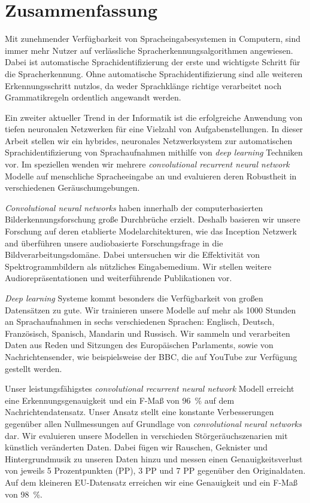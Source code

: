 \section*{\LARGE Zusammenfassung}
Mit zunehmender Verf\"ugbarkeit von Spracheingabesystemen in Computern, sind immer mehr Nutzer auf verl\"assliche Spracherkennungsalgorithmen angewiesen. Dabei ist automatische Sprachidentifizierung der erste und wichtigste Schritt f\"ur die Spracherkennung. Ohne automatische Sprachidentifizierung sind alle weiteren Erkennungsschritt nutzlos, da weder Sprachkl\"ange richtige verarbeitet noch Grammatikregeln ordentlich angewandt werden.

Ein zweiter aktueller Trend in der Informatik ist die erfolgreiche Anwendung von tiefen neuronalen Netzwerken f\"ur eine Vielzahl von Aufgabenstellungen. In dieser Arbeit stellen wir ein hybrides, neuronales Netzwerksystem zur automatischen Sprachidentifizierung von Sprachaufnahmen mithilfe von \emph{deep learning} Techniken vor. Im speziellen wenden wir mehrere \emph{convolutional recurrent neural network} Modelle auf menschliche Spracheeingabe an und evaluieren deren Robustheit in verschiedenen Ger\"auschumgebungen.

\emph{Convolutional neural networks} haben innerhalb der computerbasierten Bilderkennungsforschung gro{\ss}e Durchbr\"uche erzielt. Deshalb basieren wir unsere Forschung auf deren etablierte Modelarchitekturen, wie das Inception Netzwerk\cite{szegedy2015going} and \"uberf\"uhren unsere audiobasierte Forschungsfrage in die Bildverarbeitungsdom\"ane. Dabei untersuchen wir die Effektivit\"at von Spektrogrammbildern als n\"utzliches Eingabemedium. Wir stellen weitere Audiorepr\"asentationen und weiterf\"uhrende Publikationen vor.

\emph{Deep learning} Systeme kommt besonders die Verf\"ugbarkeit von gro{\ss}en Datens\"atzen zu gute. Wir trainieren unsere Modelle auf mehr als \num{1000} Stunden an Sprachaufnahmen in sechs verschiedenen Sprachen: Englisch, Deutsch, Franz\"osisch, Spanisch, Mandarin und Russisch. Wir sammeln und verarbeiten Daten aus Reden und Sitzungen des Europ\"aischen Parlaments, sowie von Nachrichtensender, wie beispielsweise der BBC, die auf YouTube zur Verf\"ugung gestellt werden.

Unser leistungsf\"ahigstes \emph{convolutional recurrent neural network} Modell erreicht eine Erkennungsgenauigkeit und ein F-Ma{\ss} von \SI{96}{\percent} auf dem Nachrichtendatensatz. Unser Ansatz stellt eine konstante Verbesserungen gegen\"uber allen Nullmessungen auf Grundlage von \emph{convolutional neural networks} dar. Wir evaluieren unsere Modellen in verschieden St\"orger\"auchszenarien mit k\"unstlich ver\"anderten Daten. Dabei f\"ugen wir Rauschen, Geknister und Hintergrundmusik zu unseren Daten hinzu und messen einen Genauigkeitsverlust von jeweils 5 Prozentpunkten (PP), 3 PP und 7 PP gegen\"uber den Originaldaten. Auf dem kleineren EU-Datensatz erreichen wir eine Genauigkeit und ein F-Ma{\ss} von \SI{98}{\percent}.